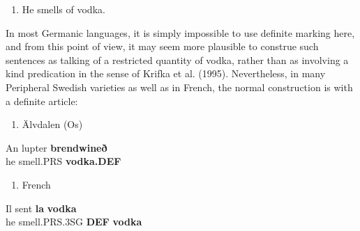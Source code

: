 \begin{enumerate} %
\item 
He smells of vodka.

\end{enumerate} %
In most Germanic languages, it is simply impossible to use definite marking here, and from this point of view, it may seem more plausible to construe such sentences as talking of a restricted quantity of vodka, rather than as involving a kind predication in the sense of Krifka et al. (1995). Nevertheless, in many Peripheral Swedish varieties as well as in French, the normal construction is with a definite article: 

\begin{enumerate} %
\item 
Älvdalen (Os)

\end{enumerate} %
\ea\label{}
\gll An  lupter  \textbf{brendwineð}\\


he  smell.PRS  \textbf{vodka.DEF}\\ %


\begin{enumerate} %
\item 
French

\end{enumerate} %
\ea\label{}
\gll Il  sent  \textbf{la} \textbf{vodka}\\


he  smell.PRS.3SG  \textbf{DEF} \textbf{vodka}\\ %


